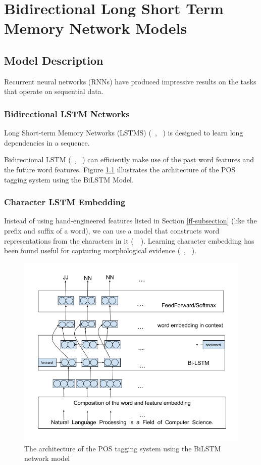 \documentclass{sfuthesis}
\begin{document}
\chapter{Bidirectional Long Short Term Memory Network Models}
\section{Model Description}

Recurrent neural networks (RNNs) have produced impressive results on the tasks that operate on sequential data.

\subsection{Bidirectional LSTM Networks}

Long Short-term Memory Networks (LSTMS) (~\citeauthor{hochreiter1997long}, ~\citeyear{hochreiter1997long}) is designed to learn long dependencies in a sequence. 

Bidirectional LSTM (~\citeauthor{graves2013hybrid}, ~\citeyear{graves2013hybrid}) can efficiently make use of the past word features and the future word features. Figure \ref{fig:bilstm} illustrates the architecture of the POS tagging system using the BiLSTM Model.

\subsection{Character LSTM Embedding}
Instead of using hand-engineered features listed in Section \ref{ff-subsection} (like the prefix and suffix of a word), we can use a model that constructs word representations from the characters in it (~\citeauthor{lample2016neural}~\citeyear{lample2016neural}). Learning character embedding has been found useful for capturing morphological evidence (~\citeauthor{ling2015finding}, ~\citeyear{ling2015finding}).


\begin{figure}
  \centering
  \includegraphics[scale=0.6]{bilstm.png}
 \caption{The architecture of the POS tagging system using the BiLSTM network model}
  \label{fig:bilstm}
\end{figure}
\end{document}
